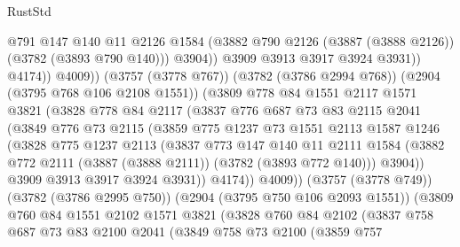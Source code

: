 \begin{lexlean}{RustStd}
\begin{coremodule}
                            @791
                            @147
                            @140
                            @11
                            @2126
                            @1584
                            (@3882 @790 @2126 (@3887 (@3888 @2126)) (@3782 (@3893 @790 @140)))
                            @3904))
                        @3909
                        @3913
                        @3917
                        @3924
                        @3931))
                    @4174))
                @4009))
            (@3757 (@3778 @767))
            (@3782 (@3786 @2994 @768))
            (@2904 (@3795 @768 @106 @2108 @1551))
            (@3809
              @778
              @84
              @1551
              @2117
              @1571
              @3821
              (@3828
                @778
                @84
                @2117
                (@3837
                  @776
                  @687
                  @73
                  @83
                  @2115
                  @2041
                  (@3849
                    @776
                    @73
                    @2115
                    (@3859
                      @775
                      @1237
                      @73
                      @1551
                      @2113
                      @1587
                      @1246
                      (@3828
                        @775
                        @1237
                        @2113
                        (@3837
                          @773
                          @147
                          @140
                          @11
                          @2111
                          @1584
                          (@3882 @772 @2111 (@3887 (@3888 @2111)) (@3782 (@3893 @772 @140)))
                          @3904))
                      @3909
                      @3913
                      @3917
                      @3924
                      @3931))
                  @4174))
              @4009))
          (@3757 (@3778 @749))
          (@3782 (@3786 @2995 @750))
          (@2904 (@3795 @750 @106 @2093 @1551))
          (@3809
            @760
            @84
            @1551
            @2102
            @1571
            @3821
            (@3828
              @760
              @84
              @2102
              (@3837
                @758
                @687
                @73
                @83
                @2100
                @2041
                (@3849
                  @758
                  @73
                  @2100
                  (@3859
                    @757

\end{coremodule}
\end{lexlean}
